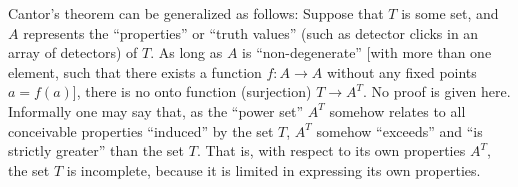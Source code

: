 Cantor's theorem can be generalized as follows:
Suppose that $T$ is some set, and
$A$ represents the ``properties'' or ``truth values'' (such as detector clicks in an array of detectors) of $T$.
As long as $A$ is ``non-degenerate'' [with more than one element, such that there exists a function $f:A \rightarrow A$ without any fixed points $a = f(a)$],
there is no onto function (surjection)
$T \rightarrow A^T$.
No proof \cite{Yanofsky-BSL:9051621}
is given here.
Informally one may say that, as the ``power set'' $A^T$ somehow relates to all conceivable properties ``induced'' by the set $T$,
$A^T$ somehow ``exceeds'' and ``is strictly greater'' than the set $T$.
That is, with respect to its own properties $A^T$, the set $T$ is incomplete, because it is limited in expressing its own properties.



\begin{center}
{\color{olive}   \Huge
\decofourright
}
\end{center}
